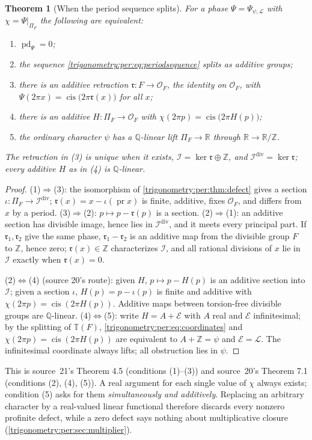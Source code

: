 \documentclass[11pt,letterpaper]{article}
\numberwithin{equation}{section}
\newtheorem{theorem}{Theorem}[section]
\theoremstyle{definition}
\theoremstyle{remark}
\newcommand{\R}{\mathbb R}
\newcommand{\Q}{\mathbb Q}
\newcommand{\Z}{\mathbb Z}
\newcommand{\OO}{\mathcal O}
\newcommand{\TT}{\mathbb T}
\newcommand{\cis}{\operatorname{cis}}
\newcommand{\pr}{\operatorname{pr}}
\newcommand{\pd}{\operatorname{pd}}
\newcommand{\cI}{\mathcal I}
\newcommand{\cL}{\mathcal L}
\begin{document}
\begin{theorem}[When the period sequence splits]\label{trigonometry:per:thm:split}
For a phase $\Psi=\Psi_{\psi,\cL}$ with $\chi=\Psi|_{\Pi_F}$ the following are equivalent:
\begin{enumerate}[label=(\arabic*)]
\item $\pd_\Psi=0$;
\item the sequence \eqref{trigonometry:per:eq:periodsequence} splits as additive groups;
\item there is an additive retraction $\mathfrak r:F\to\OO_F$, the identity on $\OO_F$, with
 $\Psi(2\pi x)=\cis\bigl(2\pi\mathfrak r(x)\bigr)$ for all $x$;
\item there is an additive $H:\Pi_F\to\OO_F$ with $\chi(2\pi p)=\cis\bigl(2\pi H(p)\bigr)$;
\item the ordinary character $\psi$ has a $\Q$-linear lift $\Pi_F\to\R$ through $\R\to\R/\Z$.
\end{enumerate}
The retraction in (3) is unique when it exists, $\cI=\ker\mathfrak r\oplus\Z$, and
$\cI^{\mathrm{div}}=\ker\mathfrak r$; every additive $H$ as in (4) is $\Q$-linear.
\end{theorem}
\begin{proof}
(1)$\Rightarrow$(3): the isomorphism of \cref{trigonometry:per:thm:defect} gives a section
$\iota:\Pi_F\to\cI^{\mathrm{div}}$; $\mathfrak r(x)=x-\iota(\pr x)$ is finite, additive, fixes
$\OO_F$, and differs from $x$ by a period. (3)$\Rightarrow$(2): $p\mapsto p-\mathfrak r(p)$ is a section.
(2)$\Rightarrow$(1): an additive section has divisible image, hence lies in $\cI^{\mathrm{div}}$, and
it meets every principal part. If $\mathfrak r_1,\mathfrak r_2$ give the same phase, $\mathfrak
r_1-\mathfrak r_2$ is an additive map from the divisible group $F$ to $\Z$, hence zero; $\mathfrak
r(x)\in\Z$ characterizes $\cI$, and all rational divisions of $x$ lie in $\cI$ exactly when
$\mathfrak r(x)=0$.

(2)$\Leftrightarrow$(4) (source 20's route): given $H$, $p\mapsto p-H(p)$ is an additive section into
$\cI$; given a section $\iota$, $H(p)=p-\iota(p)$ is finite and additive with $\chi(2\pi p)=\cis(2\pi H(p))$.
Additive maps between torsion-free divisible groups are $\Q$-linear. (4)$\Leftrightarrow$(5): write
$H=A+\mathcal E$ with $A$ real and $\mathcal E$ infinitesimal; by the splitting of $\TT(F)$,
\cref{trigonometry:per:eq:coordinates} and $\chi(2\pi p)=\cis(2\pi H(p))$ are equivalent to
$A+\Z=\psi$ and $\mathcal E=\cL$. The infinitesimal coordinate always lifts; all obstruction lies in
$\psi$.
\end{proof}
This is source~21's Theorem 4.5 (conditions (1)--(3)) and source~20's Theorem 7.1 (conditions (2),
(4), (5)). A real argument for each single value of $\chi$ always exists; condition (5) asks for them
\emph{simultaneously and additively}. Replacing an arbitrary character by a real-valued linear
functional therefore discards every nonzero profinite defect, while a zero defect says nothing about
multiplicative closure (\cref{trigonometry:per:sec:multiplier}).
\end{document}
